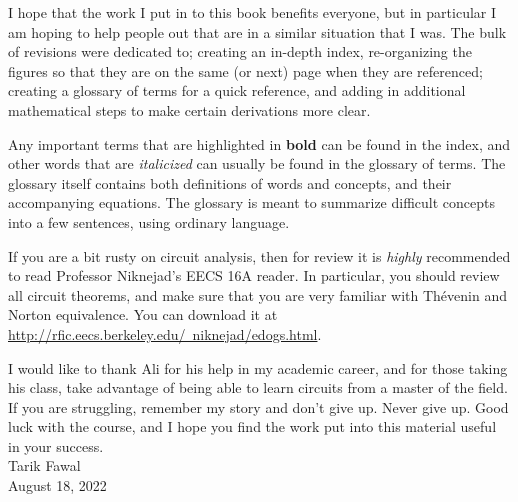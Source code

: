 I hope that the work I put in to this book benefits everyone, but in particular I am hoping to help people out that are in a similar situation that I was.  The bulk of revisions were dedicated to; creating an in-depth index, re-organizing the figures so that they are on the same (or next) page when they are referenced; creating a glossary of terms for a quick reference, and adding in additional mathematical steps to make certain derivations more clear.

Any important terms that are highlighted in \textbf{bold} can be found in the index, and other words that are \textit{italicized} can usually be found in the glossary of terms.  The glossary itself contains both definitions of words and concepts, and their accompanying equations.  The glossary is meant to summarize difficult concepts into a few sentences, using ordinary language.

If you are a bit rusty on circuit analysis, then for review it is \emph{highly} recommended to read Professor Niknejad's EECS 16A reader.  In particular, you should review all circuit theorems, and make sure that you are very familiar with Thévenin and Norton equivalence.  You can download it at \href{http://rfic.eecs.berkeley.edu/~niknejad/edogs.html}{http://rfic.eecs.berkeley.edu/~niknejad/edogs.html}.

I would like to thank Ali for his help in my academic career, and for those taking his class, take advantage of being able to learn circuits from a master of the field.  If you are struggling, remember my story and don't give up.  Never give up.  Good luck with the course, and I hope you find the work put into this material useful in your success.\\[0.5cm]
\noindent
Tarik Fawal\\[0.15cm]
August 18, 2022
